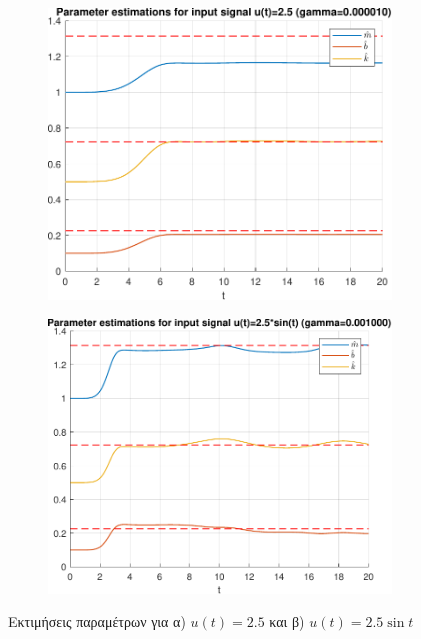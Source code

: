 \documentclass[a4paper,12pt]{article}
\begin{document}
\begin{figure}[h!]
    \centering
    \begin{subfigure}{0.45\textwidth}
        \centering
        \includegraphics[width=\linewidth]{plot/task1_parameter_estimations_gradient_descend_1.pdf}
        \caption{}
        \label{fig:task1_parameter_estimations_gradient_descend_1}
    \end{subfigure}
    \hfill
    \begin{subfigure}{0.45\textwidth}
        \centering
        \includegraphics[width=\linewidth]{plot/task1_parameter_estimations_gradient_descend_2.pdf}
        \caption{}
        \label{fig:task1_parameter_estimations_gradient_descend_2}
    \end{subfigure}
    \caption{Εκτιμήσεις παραμέτρων για α) $u(t) = 2.5$ και β) $u(t) = 2.5 \sin t$}
    \label{fig:task1_parameter_estimations_gradient_descend}
\end{figure}
\end{document}
